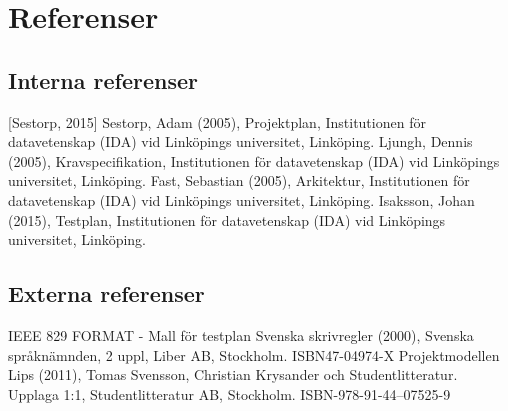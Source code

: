 \section{Referenser}


\subsection{Interna referenser}
[Sestorp, 2015] Sestorp, Adam (2005), Projektplan, Institutionen för datavetenskap
(IDA) vid Linköpings universitet, Linköping.
\newline
\newline
[Ljungh, 2015] Ljungh, Dennis (2005), Kravspecifikation, Institutionen för datavetenskap
(IDA) vid Linköpings universitet, Linköping.
\newline
\newline
[Fast, 2015] Fast, Sebastian (2005), Arkitektur, Institutionen för datavetenskap
(IDA) vid Linköpings universitet, Linköping.
\newline
\newline
[Isaksson, 2015] Isaksson, Johan (2015), Testplan, Institutionen för datavetenskap
(IDA) vid Linköpings universitet, Linköping.

\subsection{Externa referenser}
IEEE 829 FORMAT - Mall för testplan
\newline
\newline
Svenska skrivregler (2000), Svenska språknämnden, 2 uppl, Liber AB, Stockholm. ISBN47-04974-X
\newline
\newline
Projektmodellen Lips (2011), Tomas Svensson, Christian Krysander och Studentlitteratur. Upplaga 1:1, Studentlitteratur AB, Stockholm. ISBN-978-91-44--07525-9